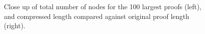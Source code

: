 \begin{figure}
\centering
\caption{Close up of total number of nodes for the 100 largest proofs (left), and compressed length compared against original proof length (right).}
\label{fig:ex3}
\end{figure}


